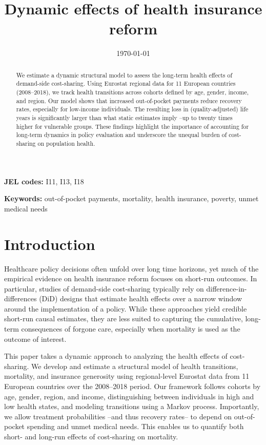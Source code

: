 \documentclass[a4paper,12pt]{article}
\date{\today}
\title{Dynamic effects of health insurance reform}
\begin{document}
\maketitle
\begin{abstract}
We estimate a dynamic structural model to assess the long-term health effects of demand-side cost-sharing. Using Eurostat regional data for 11 European countries (2008–2018), we track health transitions across cohorts defined by age, gender, income, and region. Our model shows that increased out-of-pocket payments reduce recovery rates, especially for low-income individuals. The resulting loss in (quality-adjusted) life years is significantly larger than what static estimates imply --up to twenty times higher for vulnerable groups. These findings highlight the importance of accounting for long-term dynamics in policy evaluation and underscore the unequal burden of cost-sharing on population health.
\end{abstract}


\textbf{JEL codes:} I11, I13, I18

\textbf{Keywords:} out-of-pocket payments, mortality, health insurance, poverty, unmet medical needs





\newpage
\section{Introduction}
\label{sec:org94b2dbc}


Healthcare policy decisions often unfold over long time horizons, yet much of the empirical evidence on health insurance reform focuses on short-run outcomes. In particular, studies of demand-side cost-sharing typically rely on difference-in-differences (DiD) designs that estimate health effects over a narrow window around the implementation of a policy. While these approaches yield credible short-run causal estimates, they are less suited to capturing the cumulative, long-term consequences of forgone care, especially when mortality is used as the outcome of interest.

This paper takes a dynamic approach to analyzing the health effects of cost-sharing. We develop and estimate a structural model of health transitions, mortality, and insurance generosity using regional-level Eurostat data from 11 European countries over the 2008–2018 period. Our framework follows cohorts by age, gender, region, and income, distinguishing between individuals in high and low health states, and modeling transitions using a Markov process. Importantly, we allow treatment probabilities --and thus recovery rates-- to depend on out-of-pocket spending and unmet medical needs. This enables us to quantify both short- and long-run effects of cost-sharing on mortality.
\end{document}
